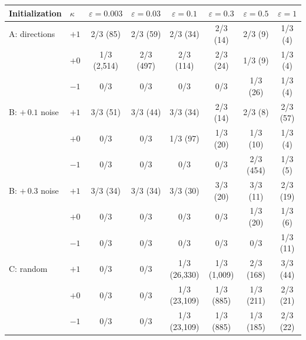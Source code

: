 \begin{tabular}{@{}llcccccc@{}}
\toprule
Initialization & $\kappa$ & $\varepsilon=0.003$ & $\varepsilon=0.03$ & $\varepsilon=0.1$ & $\varepsilon=0.3$ & $\varepsilon=0.5$ & $\varepsilon=1$\\
\midrule
A: directions & $+1$ & 2/3 (85) & 2/3 (59) & 2/3 (34) & 2/3 (14) & 2/3 (9) & 1/3 (4)\\
 & $+0$ & 1/3 (2,514) & 2/3 (497) & 2/3 (114) & 2/3 (24) & 1/3 (9) & 1/3 (4)\\
 & $-1$ & 0/3 & 0/3 & 0/3 & 0/3 & 1/3 (26) & 1/3 (4)\\
\addlinespace
B: $+\,0.1$ noise & $+1$ & 3/3 (51) & 3/3 (44) & 3/3 (34) & 2/3 (14) & 2/3 (8) & 2/3 (57)\\
 & $+0$ & 0/3 & 0/3 & 1/3 (97) & 1/3 (20) & 1/3 (10) & 1/3 (4)\\
 & $-1$ & 0/3 & 0/3 & 0/3 & 0/3 & 2/3 (454) & 1/3 (5)\\
\addlinespace
B: $+\,0.3$ noise & $+1$ & 3/3 (34) & 3/3 (34) & 3/3 (30) & 3/3 (20) & 3/3 (11) & 2/3 (19)\\
 & $+0$ & 0/3 & 0/3 & 0/3 & 0/3 & 1/3 (20) & 1/3 (6)\\
 & $-1$ & 0/3 & 0/3 & 0/3 & 0/3 & 0/3 & 1/3 (11)\\
\addlinespace
C: random & $+1$ & 0/3 & 0/3 & 1/3 (26,330) & 1/3 (1,009) & 2/3 (168) & 3/3 (44)\\
 & $+0$ & 0/3 & 0/3 & 1/3 (23,109) & 1/3 (885) & 1/3 (211) & 2/3 (21)\\
 & $-1$ & 0/3 & 0/3 & 1/3 (23,109) & 1/3 (885) & 1/3 (185) & 2/3 (22)\\
\bottomrule
\end{tabular}
